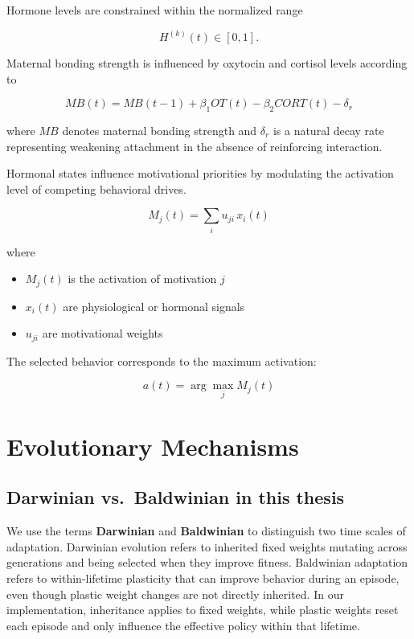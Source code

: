 Hormone levels are constrained within the normalized range

\[
H^{(k)}(t) \in [0,1].
\]


Maternal bonding strength is influenced by oxytocin and cortisol
levels according to

\begin{equation}
MB(t)
=
MB(t-1)
+
\beta_1 OT(t)
-
\beta_2 CORT(t)
-
\delta_r
\end{equation}

where \(MB\) denotes maternal bonding strength and \(\delta_r\) is a
natural decay rate representing weakening attachment in the absence
of reinforcing interaction.


Hormonal states influence motivational priorities by modulating the
activation level of competing behavioral drives.

\[
M_j(t)
=
\sum_i
u_{ji} \, x_i(t)
\]

where

\begin{itemize}
\item \(M_j(t)\) is the activation of motivation \(j\)
\item \(x_i(t)\) are physiological or hormonal signals
\item \(u_{ji}\) are motivational weights
\end{itemize}

The selected behavior corresponds to the maximum activation:

\[
a(t) = \arg\max_j M_j(t)
\]
















\section{Evolutionary Mechanisms}
    
    

\subsection{Darwinian vs.\ Baldwinian in this thesis}
We use the terms \textbf{Darwinian} and \textbf{Baldwinian} to distinguish two time scales of adaptation. Darwinian evolution refers to inherited fixed weights mutating across generations and being selected when they improve fitness. Baldwinian adaptation refers to within-lifetime plasticity that can improve behavior during an episode, even though plastic weight changes are not directly inherited. In our implementation, inheritance applies to fixed weights, while plastic weights reset each episode and only influence the effective policy within that lifetime.

